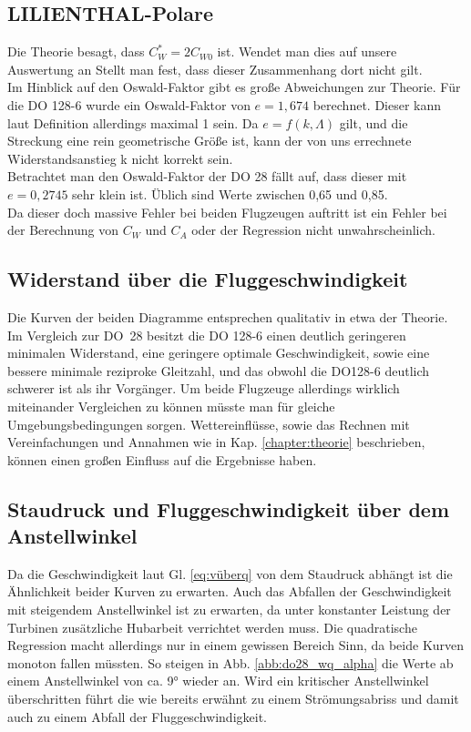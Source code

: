 \subsection{LILIENTHAL-Polare}
Die Theorie besagt, dass $C_{W}^{*} = 2C_{W0}$ ist. Wendet man dies auf unsere Auswertung an Stellt man fest, dass dieser Zusammenhang dort nicht gilt. \\
Im Hinblick auf den Oswald-Faktor gibt es große Abweichungen zur Theorie. Für die DO 128-6 wurde ein Oswald-Faktor von $e=1,674$ berechnet. Dieser kann laut Definition allerdings maximal 1 sein. Da $e=f(k, \Lambda)$ gilt, und die Streckung eine rein geometrische Größe ist, kann der von uns errechnete Widerstandsanstieg k nicht korrekt sein. \\ Betrachtet man den Oswald-Faktor der DO 28 fällt auf, dass dieser mit $e=0,2745$ sehr klein ist. Üblich sind Werte zwischen 0,65 und 0,85. \\
Da dieser doch massive Fehler bei beiden Flugzeugen auftritt ist ein Fehler bei der Berechnung von $C_W$ und $C_A$ oder der Regression nicht unwahrscheinlich.
\subsection{Widerstand über die Fluggeschwindigkeit}
Die Kurven der beiden Diagramme entsprechen qualitativ in etwa der Theorie. Im Vergleich zur DO~28 besitzt die DO 128-6 einen deutlich geringeren minimalen Widerstand, eine geringere optimale Geschwindigkeit, sowie eine bessere minimale reziproke Gleitzahl, und das obwohl die \linebreak[4]DO128-6 deutlich schwerer ist als ihr Vorgänger. Um beide Flugzeuge allerdings wirklich miteinander Vergleichen zu können müsste man für gleiche Umgebungsbedingungen sorgen. Wettereinflüsse, sowie das Rechnen mit Vereinfachungen und Annahmen wie in Kap. \ref{chapter:theorie} beschrieben, können einen großen Einfluss auf die Ergebnisse haben.
\subsection{Staudruck und Fluggeschwindigkeit über dem Anstellwinkel}
Da die Geschwindigkeit laut Gl. \ref{eq:vüberq} von dem Staudruck abhängt ist die Ähnlichkeit beider Kurven zu erwarten. Auch das Abfallen der Geschwindigkeit mit steigendem Anstellwinkel ist zu erwarten, da unter konstanter Leistung der Turbinen zusätzliche Hubarbeit verrichtet werden muss. Die quadratische Regression macht allerdings nur in einem gewissen Bereich Sinn, da beide Kurven monoton fallen müssten. So steigen in Abb. \ref{abb:do28_wq_alpha} die Werte ab einem Anstellwinkel von ca. 9° wieder an. Wird ein kritischer Anstellwinkel überschritten führt die wie bereits erwähnt zu einem Strömungsabriss und damit auch zu einem Abfall der Fluggeschwindigkeit.
\vspace{10mm}

